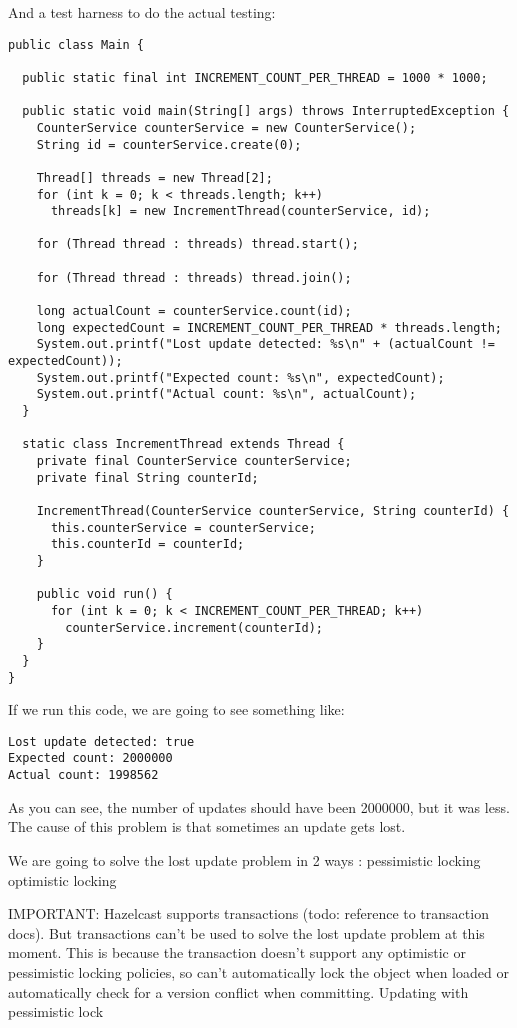 And a test harness to do the actual testing:

\begin{verbatim}
public class Main {

  public static final int INCREMENT_COUNT_PER_THREAD = 1000 * 1000;

  public static void main(String[] args) throws InterruptedException {
    CounterService counterService = new CounterService();
    String id = counterService.create(0);

    Thread[] threads = new Thread[2];
    for (int k = 0; k < threads.length; k++)
      threads[k] = new IncrementThread(counterService, id);

    for (Thread thread : threads) thread.start();

    for (Thread thread : threads) thread.join();

    long actualCount = counterService.count(id);
    long expectedCount = INCREMENT_COUNT_PER_THREAD * threads.length;
    System.out.printf("Lost update detected: %s\n" + (actualCount != expectedCount));
    System.out.printf("Expected count: %s\n", expectedCount);
    System.out.printf("Actual count: %s\n", actualCount);
  }

  static class IncrementThread extends Thread {
    private final CounterService counterService;
    private final String counterId;

    IncrementThread(CounterService counterService, String counterId) {
      this.counterService = counterService;
      this.counterId = counterId;
    }

    public void run() {
      for (int k = 0; k < INCREMENT_COUNT_PER_THREAD; k++)
        counterService.increment(counterId);
    }
  }
}
\end{verbatim}

If we run this code, we are going to see something like:

\begin{verbatim}
Lost update detected: true
Expected count: 2000000
Actual count: 1998562
\end{verbatim}

As you can see, the number of updates should have been 2000000, but it was less. The cause of this problem is that sometimes an update gets lost.

We are going to solve the lost update problem in 2 ways :
pessimistic locking
optimistic locking

IMPORTANT: Hazelcast supports transactions (todo: reference to transaction docs). But transactions can't be used to solve the lost update problem at this moment. This is because the transaction doesn't support any optimistic or pessimistic locking policies, so can't automatically lock the object when loaded or automatically check for a version conflict when committing.
Updating with pessimistic lock

